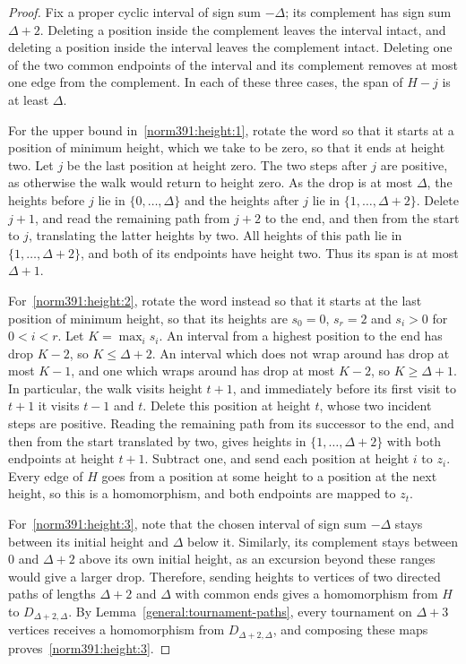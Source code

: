 \begin{proof}
Fix a proper cyclic interval of sign sum $-\Delta$; its complement has sign sum $\Delta+2$. Deleting a position inside the complement leaves the interval intact, and deleting a position inside the interval leaves the complement intact. Deleting one of the two common endpoints of the interval and its complement removes at most one edge from the complement. In each of these three cases, the span of $H-j$ is at least $\Delta$.

For the upper bound in~\ref{norm391:height:1}, rotate the word so that it starts at a position of minimum height, which we take to be zero, so that it ends at height two. Let $j$ be the last position at height zero. The two steps after $j$ are positive, as otherwise the walk would return to height zero. As the drop is at most $\Delta$, the heights before $j$ lie in $\{0,\ldots,\Delta\}$ and the heights after $j$ lie in $\{1,\ldots,\Delta+2\}$. Delete $j+1$, and read the remaining path from $j+2$ to the end, and then from the start to $j$, translating the latter heights by two. All heights of this path lie in $\{1,\ldots,\Delta+2\}$, and both of its endpoints have height two. Thus its span is at most $\Delta+1$.

For~\ref{norm391:height:2}, rotate the word instead so that it starts at the last position of minimum height, so that its heights are $s_0=0$, $s_r=2$ and $s_i>0$ for $0<i<r$. Let $K=\max_is_i$. An interval from a highest position to the end has drop $K-2$, so $K\le\Delta+2$. An interval which does not wrap around has drop at most $K-1$, and one which wraps around has drop at most $K-2$, so $K\ge\Delta+1$. In particular, the walk visits height $t+1$, and immediately before its first visit to $t+1$ it visits $t-1$ and $t$. Delete this position at height $t$, whose two incident steps are positive. Reading the remaining path from its successor to the end, and then from the start translated by two, gives heights in $\{1,\ldots,\Delta+2\}$ with both endpoints at height $t+1$. Subtract one, and send each position at height $i$ to $z_i$. Every edge of $H$ goes from a position at some height to a position at the next height, so this is a homomorphism, and both endpoints are mapped to $z_t$.

For~\ref{norm391:height:3}, note that the chosen interval of sign sum $-\Delta$ stays between its initial height and $\Delta$ below it. Similarly, its complement stays between $0$ and $\Delta+2$ above its own initial height, as an excursion beyond these ranges would give a larger drop. Therefore, sending heights to vertices of two directed paths of lengths $\Delta+2$ and $\Delta$ with common ends gives a homomorphism from $H$ to $D_{\Delta+2,\Delta}$. By Lemma~\ref{general:tournament-paths}, every tournament on $\Delta+3$ vertices receives a homomorphism from $D_{\Delta+2,\Delta}$, and composing these maps proves~\ref{norm391:height:3}.
\end{proof}

